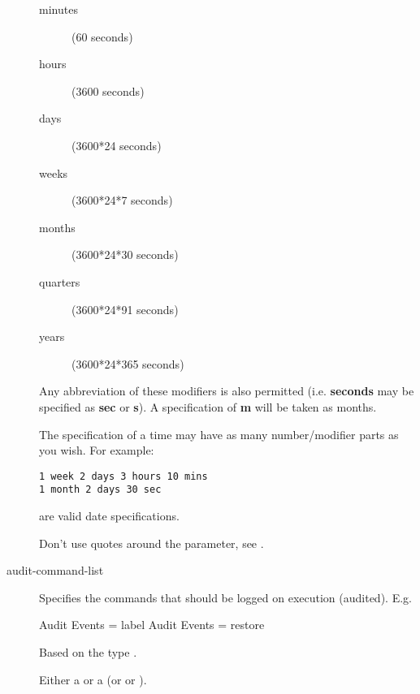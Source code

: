 \begin{description}
\begin{description}
\item [minutes]
    (60 seconds)

\item [hours]
    (3600 seconds)

\item [days]
    (3600*24 seconds)

\item [weeks]
    (3600*24*7 seconds)

\item [months]
    (3600*24*30 seconds)

\item [quarters]
    (3600*24*91 seconds)

\item [years]
    (3600*24*365 seconds)

\end{description}

Any abbreviation of these modifiers is also permitted (i.e.  {\bf seconds}
may be specified as {\bf sec} or {\bf s}).  A specification of {\bf m} will
be taken as months.

The specification of a time may have as many number/modifier parts as you
wish.  For example:

\footnotesize
\begin{verbatim}
1 week 2 days 3 hours 10 mins
1 month 2 days 30 sec
\end{verbatim}
\normalsize

are valid date specifications.

    Don't use quotes around the parameter, see .


\item [audit-command-list]
    \label{DataTypeAuditCommandList}
    Specifies the commands that should be logged on execution (audited).
    E.g.
\begin{bconfig}{}
Audit Events = label
Audit Events = restore
\end{bconfig}
    Based on the type \dtStringList.



\item [\yesno]
    \label{DataTypeYesNo}
   Either a  or a  (or  or ).


\end{description}




